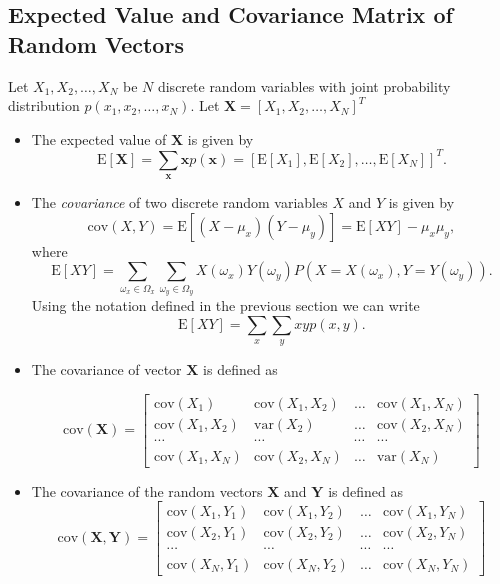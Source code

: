 \documentclass{tufte-handout}
\begin{document}
\subsection{Expected Value and Covariance Matrix of Random Vectors}

Let $X_1,X_2,\dots,X_N$ be $N$ discrete random variables with joint probability distribution
$p(x_1,x_2,\dots,x_N)$. Let  $\mathbf X= [X_1,X_2,\dots,X_N]^T$

\begin{itemize}
\item The expected value of $\mathbf X$ is given by  
$$\mathrm E[\mathbf X] =  \sum_{\mathbf x} \mathbf x p(\mathbf x)  = \left[\mathrm E[X_1], \mathrm E[X_2],\dots, \mathrm E[X_N] \right]^T.$$

\item The \textit{covariance} of two discrete random variables $X$ and $Y$ is given by
\begin{equation*}
\mathrm {cov}(X,Y) =  \mathrm E[(X-\mu_x)(Y-\mu_y)] = \mathrm  E[XY]  - \mu_x\mu_y,
\end{equation*}
where 
$$\mathrm E[XY] = \sum_{\omega_x\in \Omega_x}\sum_{\omega_y\in \Omega_y} X(\omega_x)Y( \omega_y) P(X=X(\omega_x),Y=Y(\omega_y)).$$
Using the notation defined in the previous section we can write
$$\mathrm E[XY] = \sum_{x}\sum_{y} xy p(x,y).$$


\item  The covariance of vector $\mathbf X$ is defined as

$$
 \mathrm {cov}(\mathbf X) =
\begin{bmatrix}
\mathrm {cov}(X_1) & \mathrm{ cov}(X_1,X_2)  & \dots & \mathrm{ cov}(X_1,X_N) \\
 \mathrm{ cov}(X_1,X_2) & \mathrm {var}(X_2)  & \dots &   \mathrm{ cov}(X_2,X_N) \\
\cdots &\cdots  &\cdots  & \cdots\\
 \mathrm{ cov}(X_1,X_N) &  \mathrm{ cov}(X_2,X_N)  & \dots &   \mathrm {var}(X_N)
\end{bmatrix}
$$

\item  The covariance of the random vectors $\mathbf X$ and $\mathbf Y$ is defined as
$$
 \mathrm {cov}(\mathbf X,\mathbf Y) =
\begin{bmatrix}
\mathrm {cov}(X_1,Y_1) & \mathrm{ cov}(X_1,Y_2)  & \dots & \mathrm{ cov}(X_1,Y_N) \\
 \mathrm{cov}(X_2,Y_1) & \mathrm {cov}(X_2,Y_2)  & \dots &   \mathrm{ cov}(X_2,Y_N) \\
\cdots &\cdots  &\cdots  & \cdots\\
 \mathrm{ cov}(X_N,Y_1) &  \mathrm{ cov}(X_N,Y_2)  & \dots &   \mathrm {cov}(X_N,Y_N)
\end{bmatrix}
$$

\end{itemize}
\end{document}

